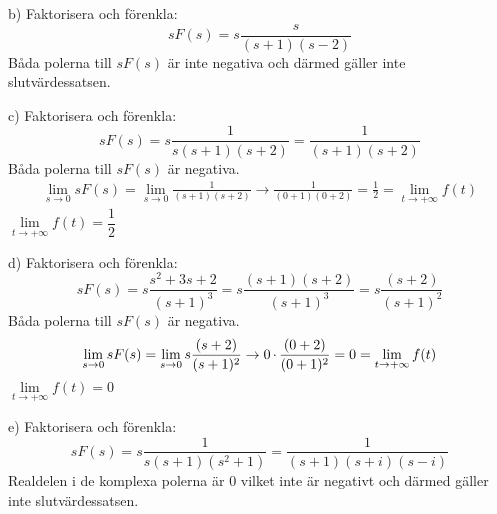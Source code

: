 \begin{task}{b)}
	Faktorisera och förenkla:
	\[sF(s)=
	s\frac{s}{(s+1)(s-2)}\]
	Båda polerna till $sF(s)$ är inte negativa och därmed gäller inte slutvärdessatsen.
\end{task}

\begin{task}{c)}
	Faktorisera och förenkla:
	\[sF(s)=
	s\frac{1}{s(s+1)(s+2)}=
	\frac{1}{(s+1)(s+2)}\]
	Båda polerna till $sF(s)$ är negativa.
	\begin{align*}
	\lim\limits_{s\rightarrow 0}sF(s)=
	\lim\limits_{s\rightarrow 0}\frac{1}{(s+1)(s+2)}\rightarrow
	\frac{1}{(0+1)(0+2)}=
	\frac{1}{2}=\lim\limits_{t\rightarrow +\infty}f(t)
	\end{align*}
	\ans $\lim\limits_{t\rightarrow +\infty}f(t)=\dfrac{1}{2}$
\end{task}

\begin{task}{d)}
	Faktorisera och förenkla:
	\[sF(s)=
	s\frac{s^2+3s+2}{(s+1)^3}=
	s\frac{(s+1)(s+2)}{(s+1)^3}=
	s\frac{(s+2)}{(s+1)^2}\]
	Båda polerna till $sF(s)$ är negativa.
	\begin{align*}
	\lim\limits_{s\rightarrow 0}sF(s)=
	\lim\limits_{s\rightarrow 0}s\frac{(s+2)}{(s+1)^2}\rightarrow
	0\operatorname{\cdot}\frac{(0+2)}{(0+1)^2}=
	0=\lim\limits_{t\rightarrow +\infty}f(t)
	\end{align*}
	\ans $\lim\limits_{t\rightarrow +\infty}f(t)=0$
\end{task}

\begin{task}{e)}
	Faktorisera och förenkla:
	\[sF(s)=
	s\frac{1}{s(s+1)(s^2+1)}=
	\frac{1}{(s+1)(s+i)(s-i)}\]
	Realdelen i de komplexa polerna är 0 vilket inte är negativt och därmed gäller inte slutvärdessatsen.
\end{task}

